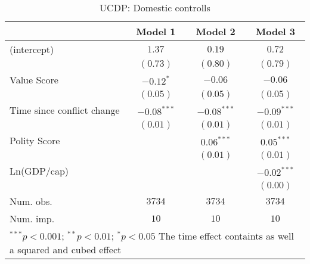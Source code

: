
\begin{table}
\begin{center}
\begin{tabular}{l c c c}
\toprule
 & Model 1 & Model 2 & Model 3 \\
\midrule
(intercept)                & $1.37$        & $0.19$        & $0.72$        \\
                           & $(0.73)$      & $(0.80)$      & $(0.79)$      \\
Value Score                & $-0.12^{*}$   & $-0.06$       & $-0.06$       \\
                           & $(0.05)$      & $(0.05)$      & $(0.05)$      \\
Time since conflict change & $-0.08^{***}$ & $-0.08^{***}$ & $-0.09^{***}$ \\
                           & $(0.01)$      & $(0.01)$      & $(0.01)$      \\
Polity Score               &               & $0.06^{***}$  & $0.05^{***}$  \\
                           &               & $(0.01)$      & $(0.01)$      \\
Ln(GDP/cap)                &               &               & $-0.02^{***}$ \\
                           &               &               & $(0.00)$      \\
\midrule
Num. obs.                  & $3734$        & $3734$        & $3734$        \\
Num. imp.                  & $10$          & $10$          & $10$          \\
\bottomrule
\multicolumn{4}{l}{\scriptsize{$^{***}p<0.001$; $^{**}p<0.01$; $^{*}p<0.05$ 
                  The time effect containts as well a squared and cubed effect}}
\end{tabular}
\caption{UCDP: Domestic controlls}
\label{UCDP_1}
\end{center}
\end{table}
